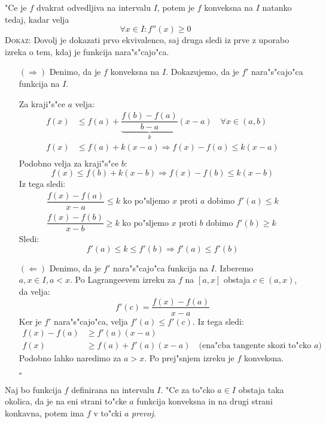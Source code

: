 "Ce je $f$ dvakrat odvedljiva na intervalu $I$, potem je $f$ konveksna na $I$ natanko tedaj, kadar velja
\begin{equation*}
\forall x \in I: f''(x) \geq 0
\end{equation*}
\textsc{Dokaz:} Dovolj je dokazati prvo ekvivalenco, saj druga sledi iz prve z uporabo izreka o tem, kdaj je funkcija nara"s"cajo"ca.
\begin{itemize}
	\item[$(\Rightarrow)$] Denimo, da je $f$ konveksna na $I$. Dokazujemo, da je $f'$ nara"s"cajo"ca funkcija na $I$.
	
	
	Za kraji"s"ce $a$ velja:
	\begin{align*}
	f(x) & \leq f(a) + \underbrace{\dfrac{f(b) - f(a)}{b-a}}_k (x-a) \quad \forall x \in (a, b) \\
	f(x) &\leq f(a) + k(x-a) \Rightarrow f(x) - f(a) \leq k(x-a) \\
	\end{align*}
	Podobno velja za kraji"s"ce $b$:
	\begin{equation*}
	f(x) \leq f(b) + k(x-b) \Rightarrow f(x) - f(b) \leq k(x - b)
	\end{equation*}
	Iz tega sledi:
	\begin{gather*}
		\dfrac{f(x) - f(a)}{x-a} \leq k \text{ ko po"sljemo $x$ proti $a$ dobimo } f'(a) \leq k\\
		\dfrac{f(x) - f(b)}{x-b} \geq k \text{ ko po"sljemo $x$ proti $b$ dobimo } f'(b) \geq k
	\end{gather*}
	Sledi:
	\begin{equation*}
	f'(a) \leq k \leq f'(b) \Rightarrow f'(a) \leq f'(b)
	\end{equation*}
	
	\item[$(\Leftarrow)$] Denimo, da je $f'$ nara"s"cajo"ca funkcija na $I$. Izberemo $a, x \in I, a < x$. Po Lagrangeevem izreku za $f$ na $[a, x]$ obstaja $c \in (a, x)$, da velja:
	\begin{equation*}
	f'(c) = \dfrac{f(x) - f(a)}{x-a}
	\end{equation*}
	Ker je $f'$ nara"s"cajo"ca, velja $f'(a) \leq f'(c)$. Iz tega sledi:
	\begin{align*}
	f(x) - f(a) &\geq f'(a) (x-a) \\
	f(x) &\geq f(a) + f'(a) (x-a) \quad \text{(ena"cba tangente skozi to"cko $a$)}
	\end{align*}
	Podobno lahko naredimo za $a > x$. Po prej"snjem izreku je $f$ konveksna.
	
	\hfill $\square$
\end{itemize}
%
 Naj bo funkcija $f$ definirana na intervalu $I$. "Ce za to"cko $a \in I$ obstaja taka okolica, da je na eni strani to"cke $a$ funkcija konveksna in na drugi strani konkavna, potem ima $f$ v to"cki $a$ \emph{prevoj}.

